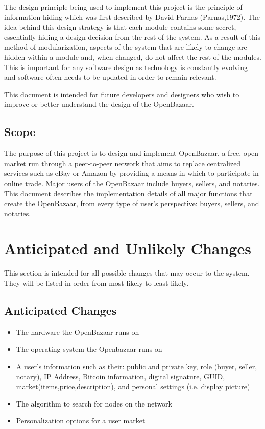 \documentclass{article}
\begin{document}
The design principle being used to implement this project is the principle of information hiding which was first described by David Parnas (Parnas,1972). The idea behind this design strategy is that each module contains some secret, essentially hiding a design decision from the rest of the system. As a result of this method of modularization, aspects of the system that are likely to change are hidden within a module and, when changed, do not affect the rest of the modules. This is important for any software design as technology is constantly evolving and software often needs to be updated in order to remain relevant.

This document is intended for future developers and designers who wish to improve or better understand the design of the OpenBazaar.

\subsection{Scope}
The purpose of this project is to design and implement OpenBazaar, a free, open market run through a peer-to-peer network that aims to replace centralized services such as eBay or Amazon by providing a means in which to participate in online trade. Major users of the OpenBazaar include buyers, sellers, and notaries. This document describes the implementation details of all major functions that create the OpenBazaar, from every type of user's perspective: buyers, sellers, and notaries.


\section*{Anticipated and Unlikely Changes}
This section is intended for all possible changes that may occur to the system. They will be listed in order from most likely to least likely.
\newline
\newline
\subsection{Anticipated Changes}
\begin{itemize}
	\item
	The hardware the OpenBazaar runs on
	\item
	The operating system the Openbazaar runs on
	\item
	A user's information such as their: public and private key, role (buyer, seller, notary), IP Address, Bitcoin information, digital signature, GUID, market(items,price,description), and personal settings (i.e. display picture)
	\item
	The algorithm to search for nodes on the network
	\item
	Personalization options for a user market
\end{itemize}
\end{document}
